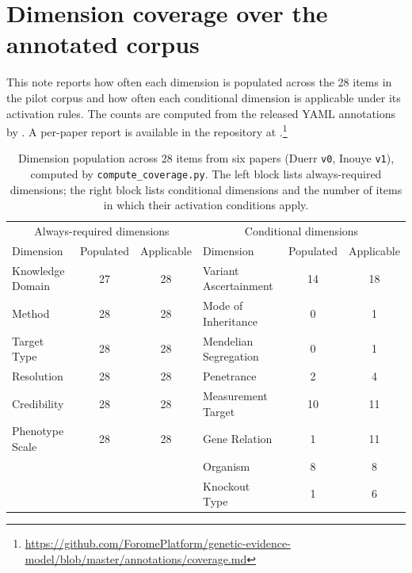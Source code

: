 
\section{Dimension coverage over the annotated corpus}
\label{sec:supp-coverage-note}

This note reports how often each dimension is populated across the 28
\GeneticEvidence{} items in the pilot corpus and how often each conditional
dimension is applicable under its activation rules. The counts are computed
from the released YAML annotations by
. A per-paper report is available in the
repository at
.\footnote{\url{https://github.com/ForomePlatform/genetic-evidence-model/blob/master/annotations/coverage.md}}

\begin{table}[H]
  \centering
  \small
  \caption[Dimension population across 28 \GeneticEvidence{} items]{Dimension
  population across 28 \GeneticEvidence{} items from six papers
  (Duerr \texttt{v0}, Inouye \texttt{v1}), computed by
  \texttt{compute\_coverage.py}. The left block lists always-required
  dimensions; the right block lists conditional dimensions and the number of
  items in which their activation conditions apply.}
  \label{tab:supp-coverage}
  \begin{tabular}{@{}lcc@{\hspace{1em}}lcc@{}}
    \toprule
    \multicolumn{3}{c}{Always-required dimensions} &
    \multicolumn{3}{c}{Conditional dimensions} \\
    Dimension             & Populated & Applicable &
    Dimension             & Populated & Applicable \\
    \midrule
    Knowledge Domain      & 27        & 28         &
    Variant Ascertainment & 14        & 18         \\
    Method                & 28        & 28         &
    Mode of Inheritance   & 0         & 1          \\
    Target Type           & 28        & 28         &
    Mendelian Segregation & 0         & 1          \\
    Resolution            & 28        & 28         &
    Penetrance            & 2         & 4          \\
    Credibility           & 28        & 28         &
    Measurement Target    & 10        & 11         \\
    Phenotype Scale       & 28        & 28         &
    Gene Relation         & 1         & 11         \\
                          &           &            &
    Organism              & 8         & 8          \\
                          &           &            &
    Knockout Type         & 1         & 6          \\
    \bottomrule
  \end{tabular}
\end{table}

